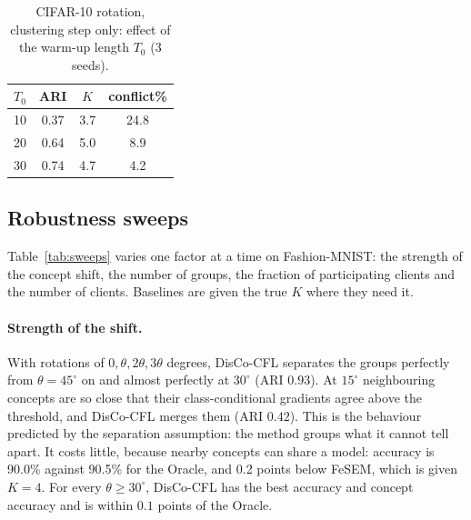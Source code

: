 \begin{table}[!htbp]
\centering
\caption{CIFAR-10 rotation, clustering step only: effect of the warm-up length $T_0$ (3 seeds).}\label{tab:warm}
\small
\begin{tabular}{lccc}
\toprule
$T_0$ & ARI & $K$ & conflict\% \\
\midrule
10 & 0.37 & 3.7 & 24.8 \\
20 & 0.64 & 5.0 & 8.9 \\
30 & 0.74 & 4.7 & 4.2 \\
\bottomrule
\end{tabular}
\end{table}

\begin{table}[!htbp]
\centering
\caption{MNIST, SVHN and CIFAR-10 (40 clients, 3 seeds; same settings and columns as Table~\ref{tab:main}). DisCo-T30: DisCo-CFL with 30 warm-up rounds.}\label{tab:other}

\end{table}

\begin{table}[!htbp]
\centering
\caption*{Table~\ref{tab:other} (continued).}

\end{table}

\subsection{Robustness sweeps}\label{sec:sweeps}
Table~\ref{tab:sweeps} varies one factor at a time on Fashion-MNIST: the strength of the concept shift, the number of groups, the fraction of participating clients and the number of clients. Baselines are given the true $K$ where they need it.

\begin{table}[!htbp]
\centering
\caption{Robustness sweeps (Fashion-MNIST, 3 seeds). For DisCo-CFL: ARI, number of clusters, conflict-merge rate, accuracy and concept accuracy. For comparison: the best baseline on accuracy and on concept accuracy (in parentheses), and the Oracle's accuracy.}\label{tab:sweeps}

\end{table}

\paragraph{Strength of the shift.} With rotations of $0,\theta,2\theta,3\theta$ degrees, DisCo-CFL separates the groups perfectly from $\theta=45^\circ$ on and almost perfectly at $30^\circ$ (ARI $0.93$). At $15^\circ$ neighbouring concepts are so close that their class-conditional gradients agree above the threshold, and DisCo-CFL merges them (ARI $0.42$). This is the behaviour predicted by the separation assumption: the method groups what it cannot tell apart. It costs little, because nearby concepts can share a model: accuracy is 90.0\% against 90.5\% for the Oracle, and 0.2 points below FeSEM, which is given $K=4$. For every $\theta\ge30^\circ$, DisCo-CFL has the best accuracy and concept accuracy and is within $0.1$ points of the Oracle.

